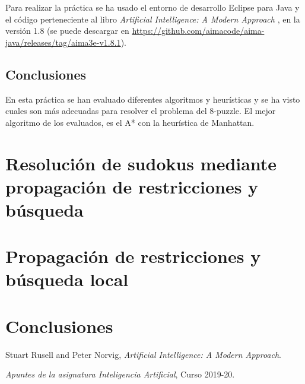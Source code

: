 \documentclass[a4paper, 10pt]{report}
\begin{document}
Para realizar la práctica se ha usado el entorno de desarrollo Eclipse para Java y el código perteneciente al libro \textit{Artificial Intelligence: A Modern Approach} \cite{AIMA}, en la versión 1.8 (se puede descargar en \url{https://github.com/aimacode/aima-java/releases/tag/aima3e-v1.8.1}).








\section{Conclusiones}
En esta práctica se han evaluado diferentes algoritmos y heurísticas y se ha visto cuales son más adecuadas para resolver el problema del 8-puzzle. El mejor algoritmo de los evaluados, es el A* con la heurística de Manhattan.
\chapter{Resolución de sudokus mediante propagación de restricciones  y búsqueda}

\chapter{Propagación de restricciones y búsqueda local}

\chapter*{Conclusiones}
 

\begin{thebibliography}{2}
 
      Stuart Rusell and Peter Norvig,
      \textit{Artificial Intelligence: A Modern Approach}.

      \bibitem{}
      \textit{Apuntes de la asignatura Inteligencia Artificial}, Curso 2019-20.
      
\end{thebibliography}
\end{document}
